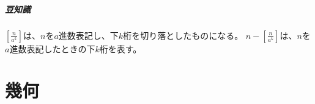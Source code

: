 \documentclass[uplatex,fleqn]{jsbook}
\begin{document}
\paragraph{豆知識}$\displaystyle \left[\frac{n}{a^k}\right]$は、$n$を$a$進数表記し、下$k$桁を切り落としたものになる。
$\displaystyle n-\left[\frac{n}{a^k}\right]$は、$n$を$a$進数表記したときの下$k$桁を表す。

\chapter{幾何}
\end{document}
